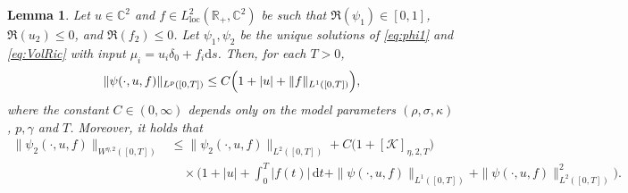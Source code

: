 \documentclass[10pt,a4paper,reqno]{amsart}
\theoremstyle{plain}
\newtheorem{lemma}[theorem]{Lemma}
\theoremstyle{definition}
\theoremstyle{remark}
\theoremstyle{example}
\begin{document}
\begin{lemma}\label{lem:Lpest}
    Let $u\in\mathbb{C}^2$ and $f\in L^2_{\mathrm{loc}}(\mathbb{R}_+,\mathbb{C}^2)$ be such that $\Re(\psi_1)\in[0,1]$, $\Re(u_2)\leq 0$, and $\Re(f_2)\leq 0$. Let $\psi_1, \psi_2$ be the unique solutions of \eqref{eq:phi1} and \eqref{eq:VolRic} with input $\mu_i = u_i \delta_0 + f_i \mathrm{d}s$. Then, for each $T>0$,
    $$
        \|\psi(\cdot, u,f)\|_{L^p([0,T])} 
        \leq C\Bigl(1 + |u| + \|f\|_{L^1([0,T])}\Bigr),
    $$
    where the constant $C\in(0,\infty)$ depends only on the model parameters $(\rho,\sigma,\kappa)$, $p, \gamma$ and $T$. Moreover, it holds that 
    \begin{align*}
    \|\psi_2(\cdot,u,f)\|_{W^{\eta,2}([0,T])} 
    &\leq \|\psi_2(\cdot, u,f)\|_{L^2([0,T])}+ C\big(1 + [\mathcal{K}]_{\eta,2,T}\big) \\
    &\quad \times
        \Big(1 + |u| + \int_0^T |f(t)|\, \mathrm{d}t + \|\psi(\cdot,u,f)\|_{L^1([0,T])} 
              + \|\psi(\cdot,u,f)\|_{L^2([0,T])}^2\Big).
    \end{align*}
\end{lemma}
\end{document}
